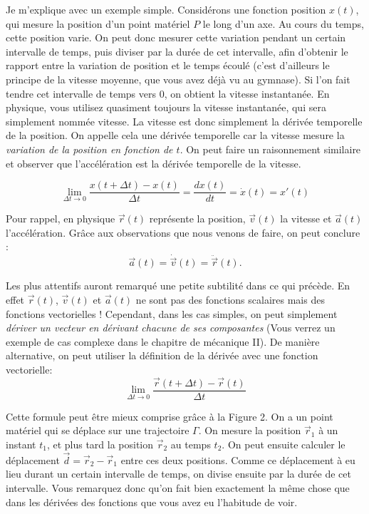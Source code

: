 \documentclass{article}
\begin{document}
Je m'explique avec un exemple simple. Considérons une fonction position $x(t)$, qui mesure la position d'un point matériel $P$ le long d'un axe. Au cours du temps, cette position varie. On peut donc mesurer cette variation pendant un certain intervalle de temps, puis diviser par la durée de cet intervalle, afin d'obtenir le rapport entre la variation de position et le temps écoulé (c'est d'ailleurs le principe de la vitesse moyenne, que vous avez déjà vu au gymnase). Si l'on fait tendre cet intervalle de temps vers $0$, on obtient la vitesse instantanée. En physique, vous utilisez quasiment toujours la vitesse instantanée, qui sera simplement nommée vitesse. La vitesse est donc simplement la dérivée temporelle de la position. On appelle cela une dérivée temporelle car la vitesse mesure la \textit{variation de la position \textit{en fonction de $t$}}. On peut faire un raisonnement similaire et observer que l'accélération est la dérivée temporelle de la vitesse. \\

\begin{tcolorbox}[title=Notation des dérivées temporelles, enlarge top by=1mm, enlarge bottom by=1mm]
\[
    \lim_{\Delta t \to 0} \frac{x(t + \Delta t) - x(t)}{\Delta t} = \frac{dx(t)}{dt} = \dot{x}(t) = x'(t)
\]
\end{tcolorbox}

Pour rappel, en physique $\vec{r}(t)$ représente la position, $\vec{v}(t)$ la vitesse et $\vec{a}(t)$ l'accélération. Grâce aux observations que nous venons de faire, on peut conclure : 
\[\boxed{ \vec{a}(t) = \dot{\vec{v}}(t) = \ddot{\vec{r}}(t).}\]

Les plus attentifs auront remarqué une petite subtilité dans ce qui précède. En effet $\vec{r}(t)$, $\vec{v}(t)$ et $\vec{a}(t)$ ne sont pas des fonctions scalaires mais des fonctions vectorielles ! Cependant, dans les cas simples, on peut simplement \textit{dériver un vecteur en dérivant chacune de ses composantes} (Vous verrez un exemple de cas complexe dans le chapitre de mécanique II). De manière alternative, on peut utiliser la définition de la dérivée avec une fonction vectorielle:  \[ \boxed{ \lim_{\Delta t \to 0} \frac{\vec{r}(t + \Delta t) - \vec{r}(t)}{\Delta t}} \]

\indent Cette formule peut être mieux comprise grâce à la Figure 2. On a un point matériel qui se déplace sur une trajectoire $\Gamma$. On mesure la position $\vec{r}_1$ à un instant $t_1$, et plus tard la position $\vec{r}_2$ au temps $t_2$. On peut ensuite calculer le déplacement $\vec{d} = \vec{r}_2 - \vec{r}_1$ entre ces deux positions. Comme ce déplacement à eu lieu durant un certain intervalle de temps, on divise ensuite par la durée de cet intervalle. Vous remarquez donc qu'on fait bien exactement la même chose que dans les dérivées des fonctions que vous avez eu l'habitude de voir.
\end{document}
